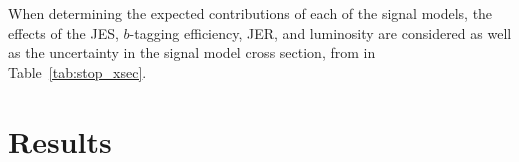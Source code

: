 \begin{table}[ht]
  \caption[
    Summary of the effect of each considered sources of systematic
    uncertainty on the total background estimate in SR~400 and SR~600.
  ]{
    Summary of the effect of each considered sources of systematic
    uncertainty on the total background estimate in SR~400 and SR~600.
    If the uncertainty is asymmetric, the larger deviation is reported in this
    table.
  }
\label{tab:systematic_breakdown}
%
\end{table}

When determining the expected contributions of each of the signal models,
the effects of the JES, $b$-tagging efficiency, JER, and luminosity are
considered as well as the uncertainty in the signal model cross section,
from in Table~\ref{tab:stop_xsec}.

\chapter[Results][Results]{Results}
\label{ch:results}

